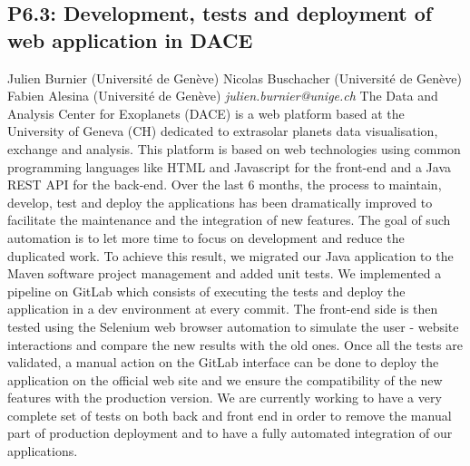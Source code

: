 \documentclass{report}
\begin{document}
\subsection*{P6.3: Development, tests and deployment of web application in DACE}
\bigskip
Julien Burnier (Université de Genève) \newline Nicolas Buschacher (Université de Genève) \newline  Fabien Alesina (Université de Genève)\newline   \newline  \newline  \newline\newline
{\it julien.burnier@unige.ch}\newline
\newline\newline
The Data and Analysis Center for Exoplanets (DACE) is a web platform based at the University of Geneva (CH) dedicated to extrasolar planets data visualisation, exchange and analysis.
This platform is based on web technologies using common programming languages like HTML and Javascript for the front-end and a Java REST API for the back-end.
Over the last 6 months, the process to maintain, develop, test and deploy the applications has been dramatically improved to facilitate the maintenance and the integration of new features. The goal of such automation is to let more time to focus on development and reduce the duplicated work.
To achieve this result, we migrated our Java application to the Maven software project management and added unit tests. We implemented a pipeline on GitLab which consists of executing the tests and deploy the application in a dev environment at every commit. The front-end side is then tested using the Selenium web browser automation to simulate the user - website interactions and compare the new results with the old ones.
Once all the tests are validated, a manual action on the GitLab interface can be done to deploy the application on the official web site and we ensure the compatibility of the new features with the production version.
We are currently working to have a very complete set of tests on both back and front end in order to remove the manual part of production deployment and to have a fully automated integration of our applications.\newline
\newpage
\end{document}
